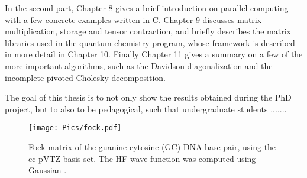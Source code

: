 In the second part, Chapter 8 gives a brief introduction on parallel computing with a few concrete examples written in C. Chapter 9 discusses matrix multiplication, storage and tensor contraction, and briefly describes the matrix libraries used in the \mchem{} quantum chemistry program, whose framework is described in more detail in Chapter 10. Finally Chapter 11 gives a summary on a few of the more important algorithms, such as the Davidson diagonalization and the incomplete pivoted Cholesky decomposition.    

The goal of this thesis is to not only show the results obtained during the PhD project, but to also to be pedagogical, such that undergraduate students .......

\begin{figure}
\centering
\texttt{[image: Pics/fock.pdf]}
\caption[Fock matrix of the GC DNA base pair]{Fock matrix of the guanine-cytosine (GC) DNA base pair, using the cc-pVTZ basis set. The HF wave function was computed using Gaussian \cite{}.}
\label{SparseExample}
\end{figure}